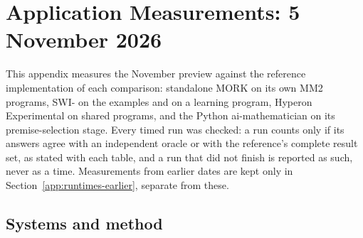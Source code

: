 \section{Application Measurements: 5 November 2026}
\label{app:runtimes-20261105}

This appendix measures the November preview against the reference
implementation of each comparison: standalone MORK on its own MM2 programs,
SWI-\PeTTa{} on the \PeTTa{} examples and on a learning program, Hyperon
Experimental on shared \HE{} programs, and the Python ai-mathematician on its
premise-selection stage.  Every timed run was checked: a run counts only if its
answers agree with an independent oracle or with the reference's complete
result set, as stated with each table, and a run that did not finish is
reported as such, never as a time.  Measurements from earlier dates are kept
only in Section~\ref{app:runtimes-earlier}, separate from these.

\subsection{Systems and method}
\label{app:runtimes-method}


